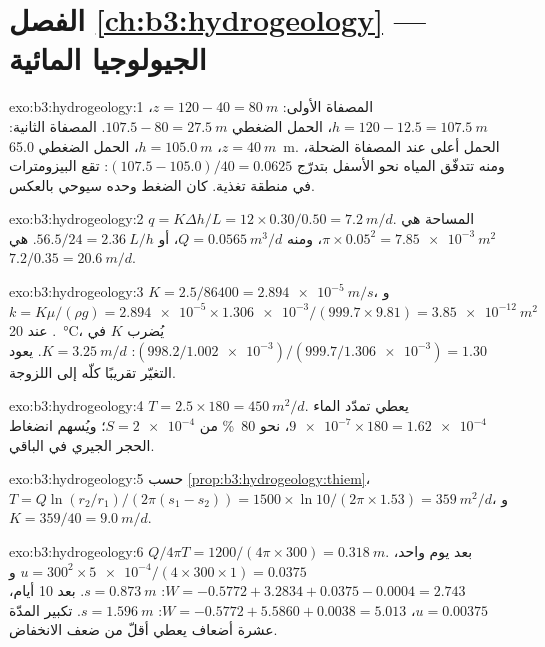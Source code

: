 \section*{الفصل \ref{ch:b3:hydrogeology} --- الجيولوجيا المائية}

\begin{solution}{exo:b3:hydrogeology:1}
المصفاة الأولى: $z = 120 - 40 = \qty{80}{m}$، $h = 120 - 12.5 =
\qty{107.5}{m}$، الحمل الضغطي $107.5 - 80 = \qty{27.5}{m}$. المصفاة الثانية:
$z = \qty{40}{m}$، $h = \qty{105.0}{m}$، الحمل الضغطي
\qty{65.0}{m}. الحمل أعلى عند المصفاة الضحلة، ومنه تتدفّق المياه
نحو الأسفل بتدرّج $(107.5 - 105.0)/40 = \num{0.0625}$:
تقع البيزومترات في منطقة تغذية. كان الضغط وحده سيوحي
بالعكس.
\end{solution}

\begin{solution}{exo:b3:hydrogeology:2}
$q = K\Delta h/L = 12\times0.30/0.50 = \qty{7.2}{m/d}$. المساحة هي
$\pi\times0.05^2 = \qty{7.85e-3}{m^2}$، ومنه $Q = \qty{0.0565}{m^3/d}$، أو
$56.5/24 = \qty{2.36}{L/h}$.  هي $7.2/0.35 =
\qty{20.6}{m/d}$.
\end{solution}

\begin{solution}{exo:b3:hydrogeology:3}
$K = 2.5/86400 = \qty{2.894e-5}{m/s}$، و$k = K\mu/(\rho g) =
\num{2.894e-5}\times\num{1.306e-3}/(999.7\times9.81) =
\qty{3.85e-12}{m^2}$. عند \qty{20}{\celsius}، يُضرب $K$ في
$(998.2/\num{1.002e-3})/(999.7/\num{1.306e-3}) = \num{1.30}$: $K =
\qty{3.25}{m/d}$. يعود التغيّر تقريبًا كلّه إلى اللزوجة.
\end{solution}

\begin{solution}{exo:b3:hydrogeology:4}
$T = 2.5\times180 = \qty{450}{m^2/d}$. يعطي تمدّد الماء
$\num{9e-7}\times180 = \num{1.62e-4}$، نحو \qty{80}{\percent} من $S =
\num{2e-4}$؛ ويُسهم انضغاط الحجر الجيري في الباقي.
\end{solution}

\begin{solution}{exo:b3:hydrogeology:5}
حسب \cref{prop:b3:hydrogeology:thiem}، $T = Q\ln(r_2/r_1)/(2\pi(s_1 -
s_2)) = 1500\times\ln10/(2\pi\times1.53) = \qty{359}{m^2/d}$، و$K =
359/40 = \qty{9.0}{m/d}$.
\end{solution}

\begin{solution}{exo:b3:hydrogeology:6}
$Q/4\pi T = 1200/(4\pi\times300) = \qty{0.318}{m}$. بعد يوم واحد، $u =
300^2\times\num{5e-4}/(4\times300\times1) = \num{0.0375}$ و$W = -0.5772
+ 3.2834 + 0.0375 - 0.0004 = \num{2.743}$: $s = \qty{0.873}{m}$. بعد 10
أيام، $u = \num{0.00375}$، $W = -0.5772 + 5.5860 + 0.0038 = \num{5.013}$:
$s = \qty{1.596}{m}$. تكبير المدّة عشرة أضعاف يعطي أقلّ من ضعف
الانخفاض.
\end{solution}

